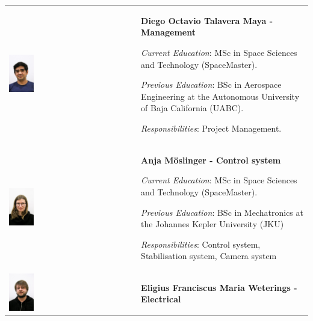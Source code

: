 \begin{longtable}[]{m{} m{}}



\includegraphics[width=0.2\textwidth]{0-cover/img/TEAMPICS/Diego_final.jpg} & \textbf{Diego Octavio Talavera Maya - Management}

\smallskip
\textit{Current Education}: MSc in Space Sciences and Technology (SpaceMaster).

\smallskip
\textit{Previous Education}: BSc in Aerospace Engineering at the Autonomous University of Baja California (UABC).

\smallskip
\textit{Responsibilities}: Project Management.
\bigskip
\\

\includegraphics[width=0.2\textwidth]{0-cover/img/TEAMPICS/Anja_final.jpg}  & \textbf{Anja M\"oslinger - Control system}

\smallskip
\textit{Current Education}: MSc in Space Sciences and Technology (SpaceMaster).

\smallskip
\textit{Previous Education}: BSc in Mechatronics at the Johannes Kepler University (JKU)

\smallskip
\textit{Responsibilities}: Control system, Stabilisation system, Camera system
\bigskip
\\

\includegraphics[width=0.2\textwidth]{0-cover/img/TEAMPICS/Elrick_final.jpg}  & \textbf{Eligius Franciscus Maria Weterings - Electrical}


\end{longtable}
